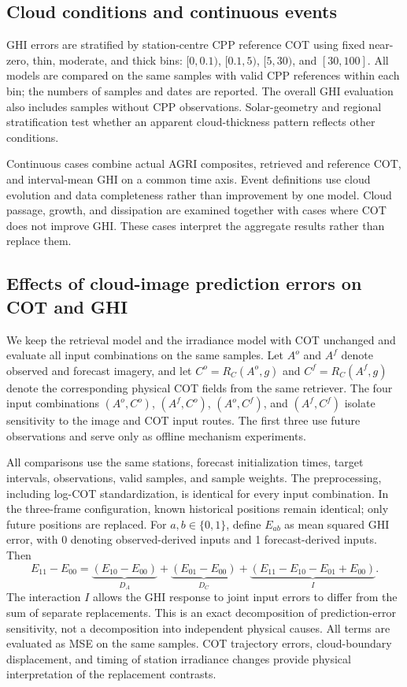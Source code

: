 \documentclass[11pt]{article}
\begin{document}
\subsection{Cloud conditions and continuous events}
GHI errors are stratified by station-centre CPP reference COT using fixed near-zero, thin, moderate, and thick bins: $[0,0.1)$, $[0.1,5)$, $[5,30)$, and $[30,100]$. All models are compared on the same samples with valid CPP references within each bin; the numbers of samples and dates are reported. The overall GHI evaluation also includes samples without CPP observations. Solar-geometry and regional stratification test whether an apparent cloud-thickness pattern reflects other conditions.

Continuous cases combine actual AGRI composites, retrieved and reference COT, and interval-mean GHI on a common time axis. Event definitions use cloud evolution and data completeness rather than improvement by one model. Cloud passage, growth, and dissipation are examined together with cases where COT does not improve GHI. These cases interpret the aggregate results rather than replace them.

\subsection{Effects of cloud-image prediction errors on COT and GHI}
We keep the retrieval model and the irradiance model with COT unchanged and evaluate all input combinations on the same samples. Let $A^o$ and $A^f$ denote observed and forecast imagery, and let $C^o=R_C(A^o,g)$ and $C^f=R_C(A^f,g)$ denote the corresponding physical COT fields from the same retriever. The four input combinations $(A^o,C^o)$, $(A^f,C^o)$, $(A^o,C^f)$, and $(A^f,C^f)$ isolate sensitivity to the image and COT input routes. The first three use future observations and serve only as offline mechanism experiments.

All comparisons use the same stations, forecast initialization times, target intervals, observations, valid samples, and sample weights. The preprocessing, including log-COT standardization, is identical for every input combination. In the three-frame configuration, known historical positions remain identical; only future positions are replaced. For $a,b\in\{0,1\}$, define $E_{ab}$ as mean squared GHI error, with 0 denoting observed-derived inputs and 1 forecast-derived inputs. Then
\begin{equation}
E_{11}-E_{00}=\underbrace{(E_{10}-E_{00})}_{D_A}
+\underbrace{(E_{01}-E_{00})}_{D_C}
+\underbrace{(E_{11}-E_{10}-E_{01}+E_{00})}_{I}.
\label{eq:propagation}
\end{equation}
The interaction $I$ allows the GHI response to joint input errors to differ from the sum of separate replacements. This is an exact decomposition of prediction-error sensitivity, not a decomposition into independent physical causes. All terms are evaluated as MSE on the same samples. COT trajectory errors, cloud-boundary displacement, and timing of station irradiance changes provide physical interpretation of the replacement contrasts.
\end{document}
